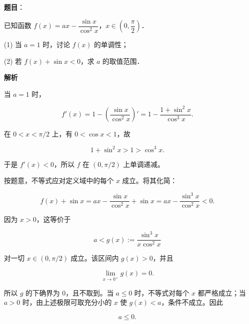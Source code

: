 \begin{answer}

\textbf{题目}：

已知函数 $f(x)=ax-\dfrac{\sin x}{\cos^2x}$，$x\in\left(0,\dfrac\pi2\right)$．

  (1) 当 $a=1$ 时，讨论 $f(x)$ 的单调性；

  (2) 若 $f(x)+\sin x<0$，求 $a$ 的取值范围．

\textbf{解析}


当 $a=1$ 时，

\nopagebreak[4]
\[
f'(x)=1-\left(\frac{\sin x}{\cos^2x}\right)'
=1-\frac{1+\sin^2x}{\cos^3x}.
\]

在 $0<x<\pi/2$ 上，有 $0<\cos x<1$，故

\nopagebreak[4]
\[
1+\sin^2x>1>\cos^3x.
\]

于是 $f'(x)<0$，所以 $f$ 在 $\left(0,\pi/2\right)$ 上单调递减。


按题意，不等式应对定义域中的每个 $x$ 成立。将其化简：

\nopagebreak[4]
\[
f(x)+\sin x
=ax-\frac{\sin x}{\cos^2x}+\sin x
=ax-\frac{\sin^3x}{\cos^2x}<0.
\]

因为 $x>0$，这等价于

\nopagebreak[4]
\[
a<g(x):=\frac{\sin^3x}{x\cos^2x}
\]

对一切 $x\in(0,\pi/2)$ 成立。该区间内 $g(x)>0$，并且

\nopagebreak[4]
\[
\lim_{x\to0^+}g(x)=0.
\]

所以 $g$ 的下确界为 $0$，且不取到。当 $a\leqslant0$ 时，不等式对每个 $x$ 都严格成立；当 $a>0$ 时，由上述极限可取充分小的 $x$ 使 $g(x)<a$，条件不成立。因此

\nopagebreak[4]
\[
a\leqslant0.
\]



\end{answer}
